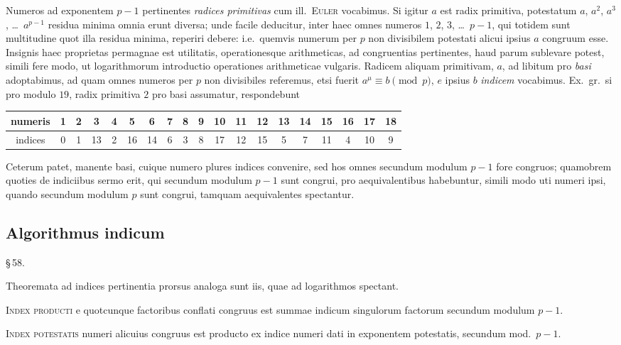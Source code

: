 \documentclass[12pt,a4paper]{article}
\theoremstyle{plain}
\theoremstyle{definition}
\theoremstyle{remark}
\begin{document}
Numeros ad exponentem $p-1$ pertinentes \emph{radices primitivas} cum ill.\ \textsc{Euler} vocabimus. Si igitur $a$ est radix primitiva, potestatum $a$, $a^2$, $a^3$, \dots\ $a^{p-1}$ residua minima omnia erunt diversa; unde facile deducitur, inter haec omnes numeros $1$, $2$, $3$, \dots\ $p-1$, qui totidem sunt multitudine quot illa residua minima, reperiri debere: i.e.\ quemvis numerum per $p$ non divisibilem potestati alicui ipsius $a$ congruum esse. Insignis haec proprietas permagnae est utilitatis, operationesque arithmeticas, ad congruentias pertinentes, haud parum sublevare potest, simili fere modo, ut logarithmorum introductio operationes arithmeticae vulgaris. Radicem aliquam primitivam, $a$, ad libitum pro \emph{basi} adoptabimus, ad quam omnes numeros per $p$ non divisibiles referemus, etsi fuerit $a^\mu \equiv b \pmod{p}$, $e$ ipsius $b$ \emph{indicem} vocabimus. Ex.\ gr.\ si pro modulo $19$, radix primitiva $2$ pro basi assumatur, respondebunt
\begin{center}
\begin{tabular}{c|cccccccccccccccccc}
numeris & 1 & 2 & 3 & 4 & 5 & 6 & 7 & 8 & 9 & 10 & 11 & 12 & 13 & 14 & 15 & 16 & 17 & 18 \\\hline
indices & 0 & 1 & 13 & 2 & 16 & 14 & 6 & 3 & 8 & 17 & 12 & 15 & 5 & 7 & 11 & 4 & 10 & 9
\end{tabular}
\end{center}
Ceterum patet, manente basi, cuique numero plures indices convenire, sed hos omnes secundum modulum $p-1$ fore congruos; quamobrem quoties de indiciibus sermo erit, qui secundum modulum $p-1$ sunt congrui, pro aequivalentibus habebuntur, simili modo uti numeri ipsi, quando secundum modulum $p$ sunt congrui, tamquam aequivalentes spectantur.

\subsection*{Algorithmus indicum}

\begin{center}\S\,58.\end{center}

Theoremata ad indices pertinentia prorsus analoga sunt iis, quae ad logarithmos spectant.

\textsc{Index producti} e quotcunque factoribus conflati congruus est summae indicum singulorum factorum secundum modulum $p-1$.

\textsc{Index potestatis} numeri alicuius congruus est producto ex indice numeri dati in exponentem potestatis, secundum mod.\ $p-1$.
\end{document}
